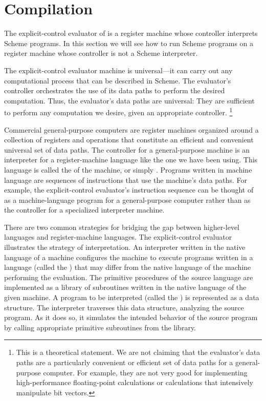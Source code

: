 \section{Compilation}
\label{Section 5.5}

The explicit-control evaluator of  is a register machine whose controller interprets Scheme programs.
In this section we will see how to run Scheme programs on a register machine whose controller is not a Scheme interpreter.

The explicit-control evaluator machine is universal---it can carry out any computational process that can be described in Scheme.
The evaluator’s controller orchestrates the use of its data paths to perform the desired computation.
Thus, the evaluator’s data paths are universal:
They are sufficient to perform any computation we desire, given an appropriate controller.%
\footnote{%
	This is a theoretical statement.
	We are not claiming that the evaluator’s data paths are a particularly convenient or efficient set of data paths for a general-purpose computer.
	For example, they are not very good for implementing high-performance floating-point calculations or calculations that intensively manipulate bit vectors.
}

Commercial general-purpose computers are register machines organized around a collection of registers and operations that constitute an efficient and convenient universal set of data paths.
The controller for a general-purpose machine is an interpreter for a register-machine language like the one we have been using.
This language is called the  of the machine, or simply .
Programs written in machine language are sequences of instructions that use the machine’s data paths.
For example, the explicit-control evaluator’s instruction sequence can be thought of as a machine-language program for a general-purpose computer rather than as the controller for a specialized interpreter machine.

There are two common strategies for bridging the gap between higher-level languages and register-machine languages.
The explicit-control evaluator illustrates the strategy of interpretation.
An interpreter written in the native language of a machine configures the machine to execute programs written in a language (called the ) that may differ from the native language of the machine performing the evaluation.
The primitive procedures of the source language are implemented as a library of subroutines written in the native language of the given machine.
A program to be interpreted (called the ) is represented as a data structure.
The interpreter traverses this data structure, analyzing the source program.
As it does so, it simulates the intended behavior of the source program by calling appropriate primitive subroutines from the library.

